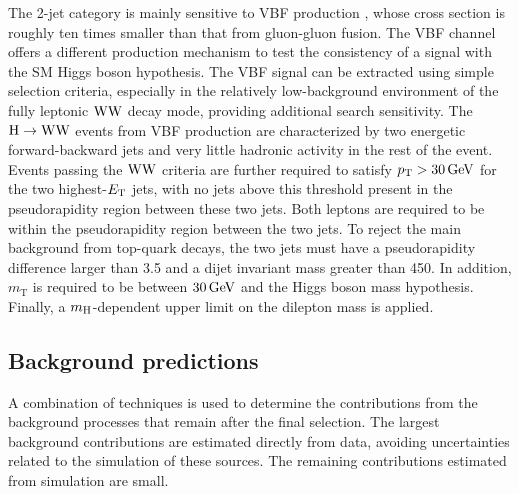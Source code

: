 \documentclass[12pt,twoside,a4paper,cmspaper,final,collab]{cms-tdr}
\begin{document}
The 2-jet category is mainly sensitive to VBF production
\cite{Ciccolini:2007jr, Ciccolini:2007ec, Arnold:2008rz,Cahn:1987}, whose
cross section is roughly ten times smaller than that from
gluon-gluon fusion. The VBF channel offers a different production mechanism
to test the consistency of a signal with the SM Higgs boson hypothesis.
The VBF signal can be extracted
using simple selection criteria, especially in the relatively low-background environment
of the fully leptonic $\mathrm{W}\mathrm{W}$ decay mode, providing additional search sensitivity.
The $\mathrm{H} \to \mathrm{W}\mathrm{W}$ events from VBF production are characterized by two
energetic forward-backward jets and very little hadronic activity in
the rest of the event.
Events passing the $\mathrm{W}\mathrm{W}$ criteria are further required to satisfy $p_{\mathrm{T}}>30\,\text{Ge\hspace{-.08em}V}$
for the two highest-$E_{\mathrm{T}}$ jets, with no jets above this threshold
present in the pseudorapidity region between these two jets. Both leptons
are required to be within the pseudorapidity region between the two jets.
To reject the main background from top-quark decays,  the two jets
must have a pseudorapidity difference larger than 3.5 and a dijet
invariant mass greater than 450\GeV.
In addition, $m_\mathrm{T}$ is required to be between $30\,\text{Ge\hspace{-.08em}V}$ and
the Higgs boson mass hypothesis. Finally, a $m_{\mathrm{H}}$-dependent upper limit on
the dilepton mass is applied. %

\subsection{Background predictions}
\label{sec:backgrounds}

A combination of techniques is used to determine the contributions from the background
processes that remain after the final selection.
The largest background contributions are estimated directly from data,
avoiding uncertainties related to
the simulation of these sources. The remaining contributions
estimated from simulation are small.
\end{document}
